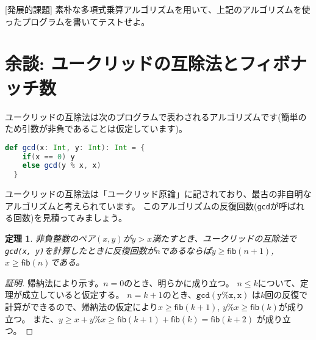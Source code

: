 \documentclass[a4paper,twoside,onecolumn,openany,article]{memoir}
\theoremstyle{plain}
\newtheorem{theorem}{定理}
\theoremstyle{remark}
\begin{document}
[発展的課題] 素朴な多項式乗算アルゴリズムを用いて、上記のアルゴリズムを使ったプログラムを書いてテストせよ。

\section*{余談: ユークリッドの互除法とフィボナッチ数}
ユークリッドの互除法は次のプログラムで表わされるアルゴリズムです(簡単のため引数が非負であることは仮定しています)。
\begin{lstlisting}[basicstyle=\ttfamily\normalsize,showstringspaces=false,language=scala]
  def gcd(x: Int, y: Int): Int = {
    if(x == 0) y
    else gcd(y % x, x)
  }
\end{lstlisting}
ユークリッドの互除法は「ユークリッド原論」に記されており、最古の非自明なアルゴリズムと考えられています。
このアルゴリズムの反復回数(\texttt{gcd}が呼ばれる回数)を見積ってみましょう。
\begin{theorem}
非負整数のペア$(x,y)$が$y> x$満たすとき、ユークリッドの互除法で\texttt{gcd(x, y)}を計算したときに反復回数が$n$であるならば$y\ge\mathsf{fib}(n+1)$, $x\ge\mathsf{fib}(n)$である。
\end{theorem}
\begin{proof}[証明]
帰納法により示す。$n=0$のとき、明らかに成り立つ。
$n\le k$について、定理が成立していると仮定する。
$n=k+1$のとき、$\mathtt{gcd(y \% x, x)}$ は$k$回の反復で計算ができるので、帰納法の仮定により$x\ge\mathsf{fib}(k+1)$, $y \% x \ge \mathsf{fib}(k)$が成り立つ。
また、$y\ge x + y \% x\ge \mathsf{fib}(k+1) + \mathsf{fib}(k) = \mathsf{fib}(k+2)$ が成り立つ。
\end{proof}
\end{document}
